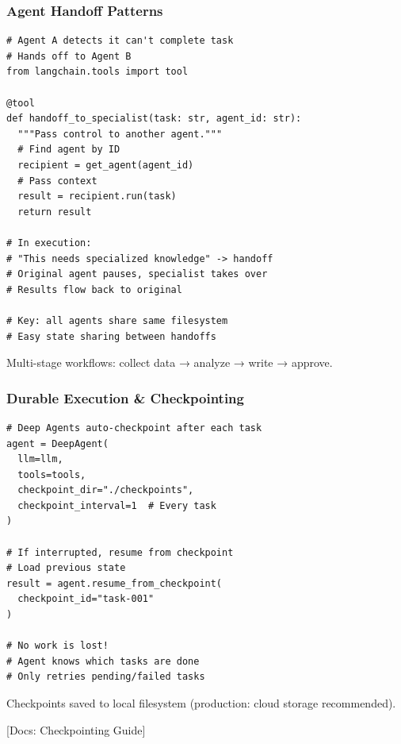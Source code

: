 \documentclass[aspectratio=169,11pt]{beamer}
\newcommand{\docref}[1]{{\scriptsize\color{docgray}[Docs: #1]}}
\begin{document}
\begin{frame}[fragile]
\frametitle{Agent Handoff Patterns}

\begin{lstlisting}
# Agent A detects it can't complete task
# Hands off to Agent B
from langchain.tools import tool

@tool
def handoff_to_specialist(task: str, agent_id: str):
  """Pass control to another agent."""
  # Find agent by ID
  recipient = get_agent(agent_id)
  # Pass context
  result = recipient.run(task)
  return result

# In execution:
# "This needs specialized knowledge" -> handoff
# Original agent pauses, specialist takes over
# Results flow back to original

# Key: all agents share same filesystem
# Easy state sharing between handoffs
\end{lstlisting}

\begin{tipbox}
Multi-stage workflows: collect data → analyze → write → approve.
\end{tipbox}

\end{frame}

\begin{frame}[fragile]
\frametitle{Durable Execution \& Checkpointing}

\begin{lstlisting}
# Deep Agents auto-checkpoint after each task
agent = DeepAgent(
  llm=llm,
  tools=tools,
  checkpoint_dir="./checkpoints",
  checkpoint_interval=1  # Every task
)

# If interrupted, resume from checkpoint
# Load previous state
result = agent.resume_from_checkpoint(
  checkpoint_id="task-001"
)

# No work is lost!
# Agent knows which tasks are done
# Only retries pending/failed tasks
\end{lstlisting}

\begin{warningbox}[Design]
Checkpoints saved to local filesystem (production: cloud storage recommended).
\end{warningbox}

\docref{Checkpointing Guide}

\end{frame}
\end{document}
